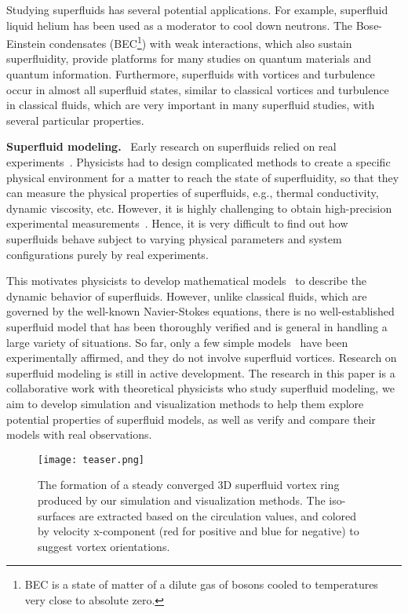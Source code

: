 \documentclass[10pt,journal,compsoc,twoside]{IEEEtran}
\newcommand{\rd}[1]{{\color[rgb]{0.0,0.0,0.0}{#1}}}
\begin{document}
	Studying superfluids has several potential applications.
		For example, superfluid liquid helium has been used as a moderator to cool down neutrons.
		The Bose-Einstein condensates (BEC\footnote{BEC is a state of matter of a dilute gas of bosons cooled to temperatures very close to absolute zero.}) with weak interactions, which also sustain superfluidity, provide platforms for many studies on quantum materials and quantum information.
		Furthermore, superfluids with vortices and turbulence occur in almost all superfluid states, similar to classical vortices and turbulence in classical fluids, which are very important in many superfluid studies, with several particular properties.
	
	\vspace*{1.5mm}
	\noindent
	{\bf Superfluid modeling.} \
	Early research on superfluids relied on real experiments~\cite{Nature_38}.
	Physicists had to design complicated methods to create a specific physical environment for a matter to reach the state of superfluidity, so that they can measure the physical properties of superfluids, e.g., thermal conductivity, dynamic viscosity, etc.
	However, it is highly challenging to obtain high-precision experimental measurements~\cite{Donnelly-91}.
	Hence, it is very difficult to find out how superfluids behave subject to varying physical parameters and system configurations purely by real experiments.
	
	This motivates physicists to develop mathematical models~\cite{HXZ_14,PRD_14} to describe the dynamic behavior of superfluids.
	However, unlike classical fluids, which are governed by the well-known Navier-Stokes equations, there is no well-established superfluid model that has been thoroughly verified and is general in handling a large variety of situations.
	So far, only a few simple models~\cite{Tisza-38,Landau-41} have been experimentally affirmed, and they do not involve superfluid vortices.
	Research on superfluid modeling is still in active development.
	The research in this paper is a collaborative work with theoretical physicists who study superfluid modeling, \rd{in which} we aim to develop simulation and visualization methods to help them explore potential properties of superfluid models, as well as verify and compare their models with real observations.
	
	\begin{figure*}[t]
		\centering
		\texttt{[image: teaser.png]}
		\caption
		{
			The formation of a steady converged 3D superfluid vortex ring produced by our simulation and visualization methods.
			The iso-surfaces are extracted based on the circulation values, and colored by velocity x-component (red for positive and blue for negative) to suggest vortex orientations.
		}
		\label{fig:teaser}
	\end{figure*}
\end{document}
